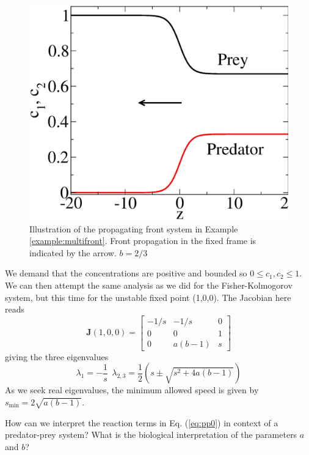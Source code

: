 \begin{example}
\begin{figure}
\begin{center}
	  \includegraphics[scale=0.3]{figs/twospecies.eps}
	\end{center}
	\caption{\label{fig:pp} Illustration of the propagating front system in
		Example \ref{example:multifront}. Front propagation in the fixed frame is 
		indicated by the arrow. $b=2/3$}
	\end{figure}

	We demand that the concentrations are positive and bounded so $0 \leq c_1,c_2 \leq 1$. 
	We can then attempt the	same analysis as we did for the Fisher-Kolmogorov system, 
	but this time for the unstable fixed point (1,0,0). The Jacobian here reads 
	\begin{equation}
	\mathbf{J}(1,0,0) =
	\begin{bmatrix}
	  -1/s & -1/s & 0 \\
	  0 & 0 &1 \\
	  0 & a(b-1) & s
	\end{bmatrix}
	\end{equation}
	giving the three eigenvalues
	\begin{equation}
		\lambda_1 = -\frac{1}{s} \ \ \lambda_{2,3}=\frac{1}{2} \left(
		s \pm \sqrt{s^2 + 4a(b-1) }	\right)
	\end{equation}
	As we seek real eigenvalues, the minimum allowed speed is given by
	$s_\text{min} = 2\sqrt{a(b-1)}$.
\end{example}

\begin{question}
How can we interpret the reaction terms in Eq. (\ref{eq:pp0}) in context of a
predator-prey system? What is the biological interpretation of the parameters
$a$ and $b$?
\end{question}

